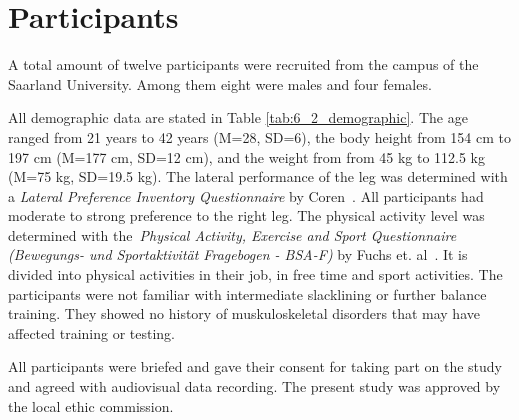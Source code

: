 \section{Participants}\label{6_participants}
A total amount of twelve participants were recruited from the campus of the Saarland University.
Among them eight were males and four females.

All demographic data are stated in Table \ref{tab:6_2_demographic}.
The age ranged from 21 years to 42 years (M=28, SD=6), the body height from 154 cm to 197 cm (M=177 cm, SD=12 cm), and the weight from from 45 kg to 112.5 kg (M=75 kg, SD=19.5 kg).
The lateral performance of the leg was determined with a \textit{Lateral Preference Inventory Questionnaire} by Coren~\cite{Coren1993-lp}.
All participants had moderate to strong preference to the right leg.
The physical activity level was determined with the~\textit{Physical Activity, Exercise and Sport Questionnaire (Bewegungs- und Sportaktivität Fragebogen - BSA-F)} by Fuchs et. al~\cite{Fuchs2015-bsa}.
It is divided into physical activities in their job, in free time and sport activities.
The participants were not familiar with intermediate slacklining or further balance training. They showed no history of muskuloskeletal disorders that may have affected training or testing.

All participants were briefed and gave their consent for taking part on the study and agreed with audiovisual data recording.
The present study was approved by the local ethic commission.

